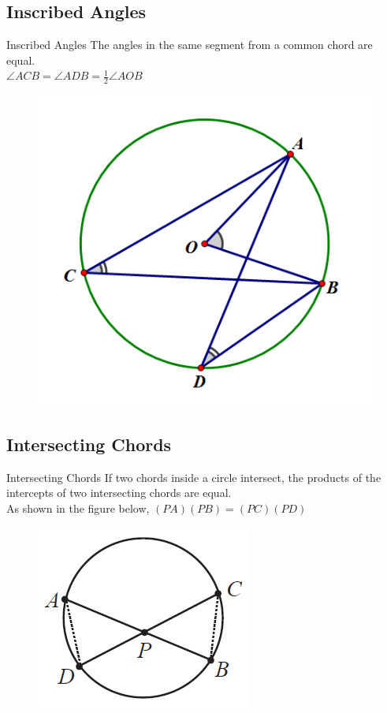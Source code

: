\documentclass{beamer}
\begin{document}
	\subsection{Inscribed Angles}
	\begin{frame}{Inscribed Angles}
The angles in the same segment from a common chord are equal.\\
$\angle ACB = \angle ADB = \frac{1}{2}\angle AOB$

\begin{figure}[h!]
	\centering
	\includegraphics[height=0.5\textheight]{Graphics/Week_13/InscribedAngles.png}
\end{figure}
\end{frame}

\subsection{Intersecting Chords}
\begin{frame}{Intersecting Chords}
If two chords inside a circle intersect, the products of the intercepts of two intersecting chords are equal.\\ As shown in the figure below, $(PA)(PB) = (PC)(PD)$
\begin{figure}[h!]
	\centering
	\includegraphics[height=0.5\textheight]{Graphics/Week_13/IntersectingChords.png}
\end{figure}
\end{frame}
\end{document}
